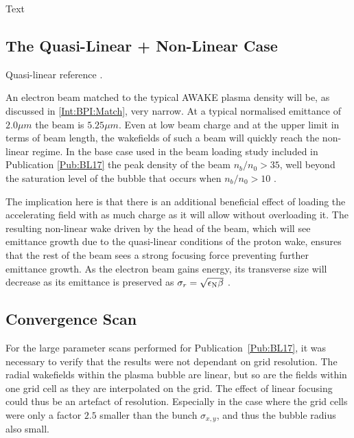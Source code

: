 Text

\subsection{The Quasi-Linear + Non-Linear Case}
\label{Sim:QLinNonLin}

Quasi-linear reference \cite{rosenzweig:2010}.

An electron beam matched to the typical AWAKE plasma density will be, as discussed in \ref{Int:BPI:Match}, very narrow. At a typical normalised emittance of $2.0\unit{\mu m}$ the beam is $5.25\unit{\mu m}$. Even at low beam charge and at the upper limit in terms of beam length, the wakefields of such a beam will quickly reach the non-linear regime. In the base case used in the beam loading study included in Publication \ref{Pub:BL17} \cite{berglyd_olsen:2018} the peak density of the beam $n_b/n_0 > 35$, well beyond the saturation level of the bubble that occurs when $n_b/n_0 > 10$ \cite{lu:2005}.

The implication here is that there is an additional beneficial effect of loading the accelerating field with as much charge as it will allow without overloading it. The resulting non-linear wake driven by the head of the beam, which will see emittance growth due to the quasi-linear conditions of the proton wake, ensures that the rest of the beam sees a strong focusing force preventing further emittance growth. As the electron beam gains energy, its transverse size will decrease as its emittance is preserved as $\sigma_{r} = \sqrt{\epsilon_{\mathrm{N}}\beta}$ \cite{wille:2001}.

\subsection{Convergence Scan}
\label{Sim:Converge}

For the large parameter scans performed for Publication~\ref{Pub:BL17}, it was necessary to verify that the results were not dependant on grid resolution.
The radial wakefields within the plasma bubble are linear, but so are the fields within one grid cell as they are interpolated on the grid.
The effect of linear focusing could thus be an artefact of resolution.
Especially in the case where the grid cells were only a factor $2.5$ smaller than the bunch $\sigma_{x,y}$, and thus the bubble radius also small.


